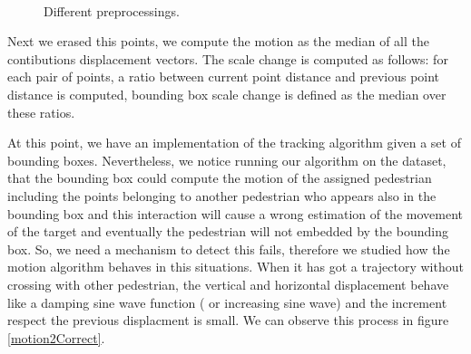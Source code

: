 \documentclass[12pt, a4paper, titlepage,twoside,openright]{article}
\begin{document}
\begin{figure}[H]
		
\centering

\\
\caption{Different preprocessings.}
\label{motion2}
\end{figure}


Next we erased this points, we compute the motion as the median of all the contibutions displacement vectors. The scale change is computed as follows: for each pair of points, a ratio between current point distance and previous point distance is computed, bounding box scale change is defined as the median over these ratios. 

At this point, we have an implementation of the tracking algorithm given a set of bounding boxes. Nevertheless, we notice running our algorithm on the dataset, that the bounding box could compute the motion of the assigned pedestrian including the points belonging to another pedestrian who appears also in the bounding box and this interaction will cause a wrong estimation of the movement of the target and eventually the pedestrian will not embedded by the bounding box. So, we need a mechanism to detect this fails, therefore we studied how the motion algorithm behaves in this situations. When it has got a trajectory without crossing with other pedestrian, the vertical and horizontal displacement behave like a damping sine wave function ( or increasing sine wave)  and the increment respect the previous displacment is small. We can observe this process in figure \ref{motion2Correct}.
\end{document}
